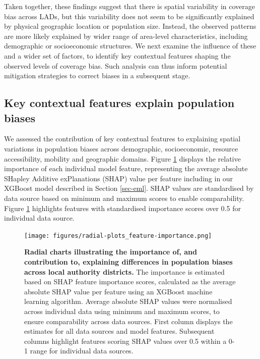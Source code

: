 \documentclass[]{rsos}%
\begin{document}
Taken together, these findings suggest that there is spatial
variability in coverage bias across LADs, but this variability does not seem to be
significantly explained by physical geographic location or population size.
Instead, the observed patterns are more likely explained by wider range of
area-level characteristics, including demographic or socioeconomic
structures. We next examine the influence of these and a wider set of factors, to identify key contextual features shaping the observed levels of coverage bias. Such analysis can thus inform potential mitigation strategies to correct biases in a subsequent stage.

\subsection{Key contextual features explain population biases}\label{sec-explain}

We assessed the contribution of key contextual features to explaining
spatial variations in population biases across demographic,
socioeconomic, resource accessibility, mobility and geographic domains.
Figure \ref{fig:radialplots} displays the relative importance of each
individual model feature, representing the average absolute SHapley
Additive exPlanations (SHAP) value per feature including in our XGBoost
model described in Section \ref{sec-eml}. SHAP values are
standardised by data source based on minimum and maximum scores to
enable comparability. Figure \ref{fig:radialplots} highlights features
with standardised importance scores over 0.5 for individual data source.

\begin{figure}
\centering
\texttt{[image: figures/radial-plots\_feature-importance.png]}
\caption{\textbf{Radial charts illustrating the importance of, and contribution to,
explaining differences in population biases across local authority
districts.} The importance is estimated based on SHAP feature
importance scores, calculated as the average absolute SHAP value per
feature using an XGBoost machine learning algorithm. Average absolute
SHAP values were normalised across individual data using minimum and
maximum scores, to ensure comparability across data sources. First
column displays the estimates for all data sources and model features.
Subsequent columns highlight features scoring SHAP values over 0.5
within a 0-1 range for individual data
sources.}\label{fig:radialplots}
\end{figure}
\end{document}
